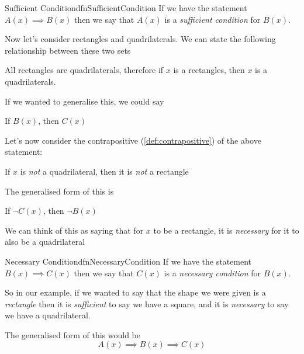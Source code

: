 \begin{dfn}[label={def:sufficentCondition}]{Sufficient Condition}{dfnSufficientCondition}
    If we have the statement $A(x) \implies B(x)$ then we say that $A(x)$ is a \emph{sufficient condition} for $B(x)$.
\end{dfn}

Now let's consider rectangles and quadrilaterals. We can state the following relationship between these two sets
\begin{center}
    All rectangles are quadrilaterals, therefore if $x$ is a rectangles, then $x$ is a quadrilaterals.
\end{center}

If we wanted to generalise this, we could say
\begin{center}
    If $B(x)$, then $C(x)$
\end{center}

Let's now consider the contrapositive (\cref{def:contrapositive}) of the above statement:
\begin{center}
    If $x$ is \emph{not} a quadrilateral, then it is \emph{not} a rectangle
\end{center}

The generalised form of this is
\begin{center}
    If $\lnot C(x)$, then $\lnot B(x)$
\end{center}

We can think of this as saying that for $x$ to be a rectangle, it is \emph{necessary} for it to also be a quadrilateral

\begin{dfn}[label={def:sufficentCondition}]{Necessary Condition}{dfnNecessaryCondition}
    If we have the statement $B(x) \implies C(x)$ then we say that $C(x)$ is a \emph{necessary condition} for $B(x)$.
\end{dfn}

So in our example, if we wanted to say that the shape we were given is a \emph{rectangle} then it is \emph{sufficient} to say we have a square, and it is \emph{necessary} to say we have a quadrilateral.

The generalised form of this would be
$$A(x) \implies B(x) \implies C(x)$$